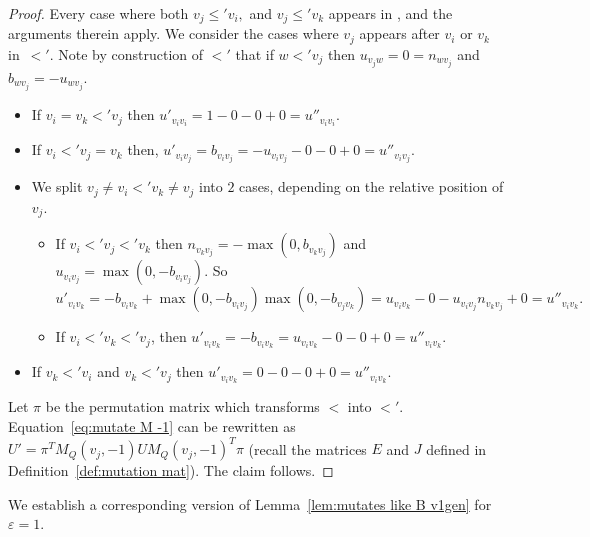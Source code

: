 \documentclass[11pt, letterpaper]{amsart}
\theoremstyle{definition}
\numberwithin{equation}{section}
\def\In{{\operatorname{In}}}
\begin{document}
\begin{proof}
Every case where both $v_j \leq' v_i,$ and $v_j \leq' v_k$ appears in \cite[Lemma 7.2]{COQ}, and the arguments therein apply.
We consider the cases where $v_j$ appears after $v_i$ or $v_k$ in~$<'$.
Note by construction of $<'$ that if $w <' v_j$ then $u_{v_jw} = 0 = n_{wv_j}$ and~$b_{wv_j} = -u_{wv_j}.$

\begin{itemize}
\item If $v_i = v_k <' v_j$ then $u'_{v_i v_i} = 1 - 0 - 0 + 0 = u''_{v_i v_i}.$
\item If $v_i <' v_j=v_k$ then, %
 $u'_{v_i v_j} = b_{v_i v_j} = -u_{v_i v_j} - 0 - 0 + 0 = u''_{v_i v_j}$.

\item We split $v_j \neq v_i <' v_k \neq v_j$ into $2$ cases, depending on the relative position of $v_j$.
\begin{itemize}
\item If $v_i <' v_j <' v_k$ then %
 $n_{v_k v_j} = -\max(0, b_{v_k v_j})$ and $u_{v_i v_j}= \max(0, -b_{v_i v_j})$.
So
$$u'_{v_i v_k} =  -b_{v_i v_k} + \max(0, -b_{v_i v_j}) \max(0, -b_{v_j v_k}) = u_{v_i v_k} - 0 - u_{v_i v_j} n_{v_k v_j} + 0 = u''_{v_i v_k}.$$
\item
If $ v_i <' v_k <' v_j$,
then
$u'_{v_i v_k} = -b_{v_i v_k} = u_{v_i v_k} - 0 - 0 + 0 = u''_{v_i v_k}.$
\end{itemize}
\item If $v_k <' v_i$ and $v_k <' v_j$ then $u'_{v_i v_k} = 0 - 0 - 0 + 0 = u''_{v_i v_k}.$ %
\end{itemize}

Let $\pi$ be the permutation matrix which transforms $<$ into $<'$. 
Equation~\eqref{eq:mutate M -1} can be rewritten as $U' = \pi^T M_Q(v_j, -1) U M_Q(v_j, -1)^T \pi$ (recall the matrices $E$ and $J$ defined in Definition~\ref{def:mutation mat}).
The claim follows.
\end{proof}


We establish a corresponding version of Lemma~\ref{lem:mutates like B v1gen} for $\varepsilon = 1$.
\end{document}
